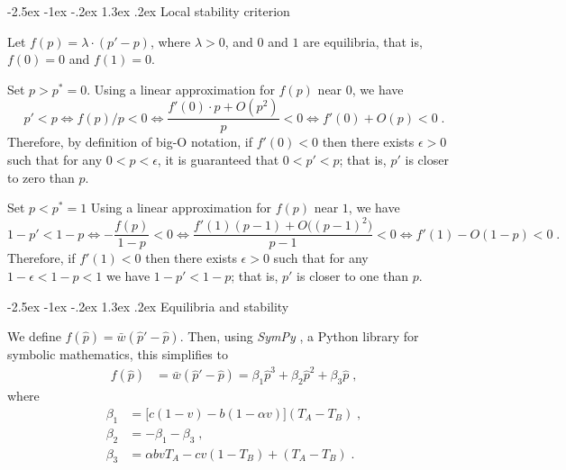 \documentclass[12pt]{extarticle}
\makeatletter
\renewcommand\section{\@startsection {section}{1}{\z@}%
     {-2.5ex \@plus -1ex \@minus -.2ex}%
     {1.3ex \@plus.2ex}%
    {\Large\bfseries}}
\makeatother
\begin{document}
\begin{appendices}
\renewcommand{\theequation}{\thesection\arabic{equation}}


\section{Local stability criterion} \label{sec:appendixA}

Let $f(p)=\lambda \cdot (p'-p)$, where $\lambda>0$, and $0$ and $1$ are equilibria, that is, $f(0)=0$ and $f(1)=0$.

Set $p>p^*=0$.
Using a linear approximation for $f(p)$ near $0$, we have
\begin{equation}
p' < p \Leftrightarrow 
f(p)/p < 0 \Leftrightarrow 
\frac{f'(0) \cdot p + O(p^2)}{p} < 0 \Leftrightarrow 
f'(0) + O(p) < 0 \;.
\end{equation}
Therefore, by definition of big-O notation, if $f'(0)<0$ then there exists $\epsilon>0$ such that for any $0<p<\epsilon$, it is guaranteed that $0<p'<p$; that is, $p'$ is closer to zero than $p$.

Set $p<p^*=1$
Using a linear approximation for $f(p)$ near $1$, we have
\begin{equation}
1-p' < 1-p  \Leftrightarrow 
-\frac{f(p)}{1-p} < 0 \Leftrightarrow 
\frac{f'(1)(p-1) + O\big((p-1)^2\big)}{p-1} < 0 \Leftrightarrow 
f'(1) - O(1-p) < 0 \;.
\end{equation}
Therefore, if $f'(1)<0$ then there exists $\epsilon>0$ such that for any $1-\epsilon<1-p<1$ we have $1-p'<1-p$; that is, $p'$ is closer to one than $p$.


\section{Equilibria and stability} \label{sec:appendixB}

We define $f(\hat{p}) = \bar{w}(\hat{p}' - \hat{p})$.
Then, using \emph{SymPy} \citep{Meurer2017}, a Python library for symbolic mathematics, this simplifies to
\begin{equation} \label{eq:general_case_polynomial}
\begin{aligned}
  f(\hat{p}) &= \bar{w}(\hat{p}'-\hat{p}) =
  \beta_1 \hat{p}^3 + \beta_2 \hat{p}^2 + \beta_3 \hat{p} \;,
\end{aligned}
\end{equation}
where 
\begin{equation} \label{eq:polynomial_coefficients}
\begin{aligned}
  \beta_1 &= \big[c(1-v) - b (1-\alpha v)\big] (T_A-T_B) \;, \\
  \beta_2 &= -\beta_1 -\beta_3 \;, \\
  \beta_3 &= \alpha bvT_A - cv(1-T_B) + (T_A-T_B) \;.
\end{aligned}
\end{equation}


\end{appendices}
\end{document}

